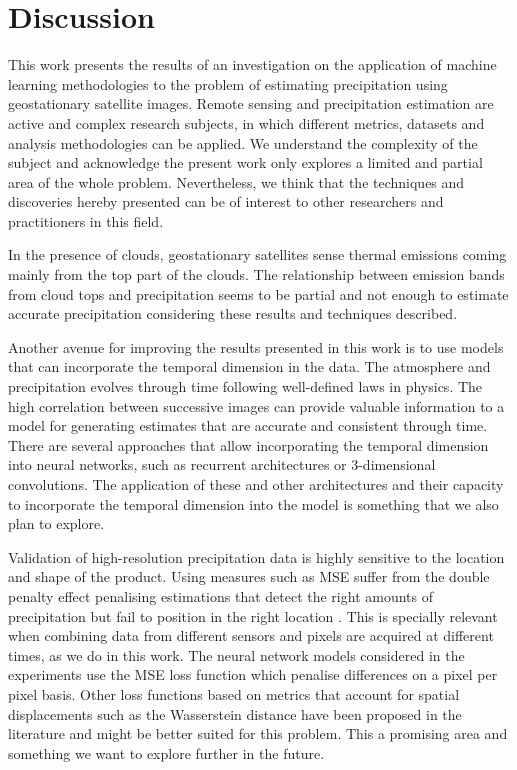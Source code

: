 \documentclass[3p,times]{elsarticle}
\begin{document}
\section{Discussion}

This work presents the results of an investigation on the application of machine learning methodologies to the problem of estimating precipitation using geostationary satellite images. Remote sensing and precipitation estimation are active and complex research subjects, in which different metrics, datasets and analysis methodologies can be applied. We understand the complexity of the subject and acknowledge the present work only explores a limited and partial area of the whole problem. Nevertheless, we think that the techniques and discoveries hereby presented can be of interest to other researchers and practitioners in this field.

In the presence of clouds, geostationary satellites sense thermal emissions coming mainly from the top part of the clouds. The relationship between emission bands from cloud tops and precipitation seems to be partial and not enough to estimate accurate precipitation considering these results and techniques described.

Another avenue for improving the results presented in this work is to use models that can incorporate the temporal dimension in the data. The atmosphere and precipitation evolves through time following well-defined laws in physics. The high correlation between successive images can provide valuable information to a model for generating estimates that are accurate and consistent through time. There are several approaches that allow incorporating the temporal dimension into neural networks, such as recurrent architectures or 3-dimensional convolutions. The application of these and other architectures and their capacity to incorporate the temporal dimension into the model is something that we also plan to explore. 

Validation of high-resolution precipitation data is highly sensitive to the location and shape of the product. Using measures such as MSE suffer from the double penalty effect penalising estimations that detect the right amounts of precipitation but fail to position in the right location \citep{anthes1983regional,mass2002does}. This is specially relevant when combining data from different sensors and pixels are acquired at different times, as we do in this work. The neural network models considered in the experiments use the MSE loss function which penalise differences on a pixel per pixel basis. Other loss functions based on metrics that account for spatial displacements such as the Wasserstein distance have been proposed in the literature \citep{farchi2016using} and might be better suited for this problem. This a promising area and something we want to explore further in the future.
\end{document}
